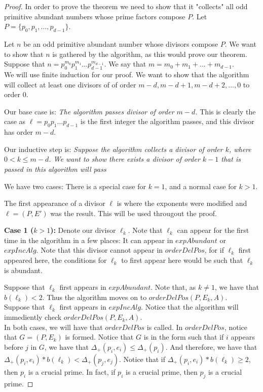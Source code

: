 \documentclass[../paper.tex]{subfiles}
\begin{document}
\begin{proof}
  In order to prove the theorem we need to show that it
"collects" all odd primitive abundant numbers whose prime factors
compose $P$. Let $P = \{p_0, p_1, ..., p_{d-1}\}$.

  Let $n$ be an odd primitive abundant number whose divisors
compose $P$. We want to show that $n$ is gathered by the
algorithm, as this would prove our theorem. Suppose that $n =
p_0^{m_0}p_1^{m_1} ... p_{d-1}^{m_{d-1}}$. We say that $m = m_0
+ m_1 + ... + m_{d-1}$. 
\\

We will use finite induction for our proof. We want to show that
the algorithm will collect at least one divisors of of order $m -
d, m - d + 1, m - d + 2, ..., 0$ to order $0$.

Our base case is: \textit{The algorithm passes divisor of order $m
- d$.} This is clearly the case as $\ell = p_0 p_1 ... p_{d-1}$ is the 
first integer the algorithm passes, and this divisor has order 
$m-d$.

Our inductive step is:
\textit{Suppose the algorithm collects a divisor of order $k$,
where $0 < k \leq m - d $. We want to show there exists a divisor
of order $k - 1$ that is passed in this algorithm will pass}

We have two cases: There is a special case for $k = 1$, and a
normal case for $k > 1$.

The first appearance of a divisor $\ell$ is where the exponents were
modified and $\ell = (P, E')$ was the result. This will be used
througout the proof.

\textbf{Case 1 ($k > 1$):} Denote our divisor $\ell_k$. Note that
$\ell_k$ can appear for the first time in the algorithm in a few
places: It can appear in $expAbundant$ or $expIncAlg$. Note that
this divisor cannot appear in $orderDelPos$, for if $\ell_k$ first
appeared here, the conditions for $\ell_k$ to first appear here
would be such that $\ell_k$ is abundant.

Suppose that $\ell_k$ first appears in $expAbundant$. Note that, as
$k \neq 1$, we have that $b(\ell_k) < 2$. Thus the algorithm moves on
to $orderDelPos(P, E_k, A)$.
\\

Suppose that $\ell_k$ first appears in $expIncAlg$. Notice that the
algorithm will immediently check $orderDelPos(P, E_k, A)$.
\\

In both cases, we will have that $orderDelPos$ is called. In
$orderDelPos$, notice that $G = (P,E_k)$ is formed. Notice that $G$
is in the form such that if $i$ appears before $j$ in $G$, we have
that $\Delta_+(p_i, e_i) \leq \Delta_+(p_i)$. And therefore, we
have that $\Delta_+(p_i, e_i) * b(\ell_k) < \Delta_+(p_j,e_j)$.
Notice that if $\Delta_+(p_i,e_i) * b(\ell_k) \geq 2$, then $p_i$ is
a crucial prime. In fact, if $p_i$ is a crucial prime, then $p_j$
is a crucial prime.


\end{proof}
\end{document}
